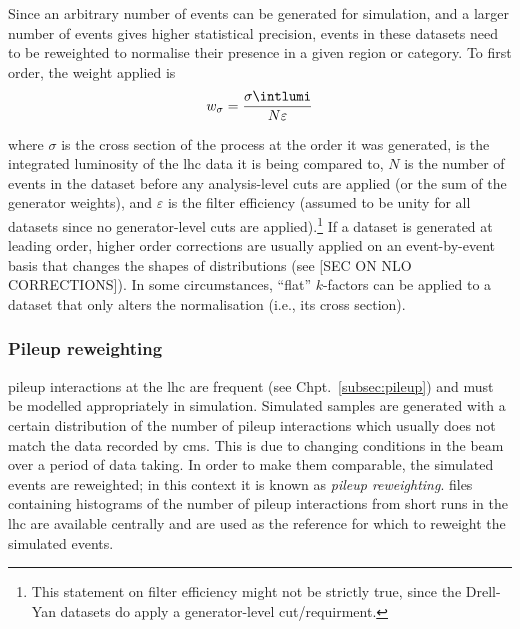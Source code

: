 Since an arbitrary number of events can be generated for simulation, and a larger number of events gives higher statistical precision, events in these datasets need to be reweighted to normalise their presence in a given region or category. To first order, the weight applied is
\begin{equation}
    w_{\sigma} = \frac{ \sigma \intlumi }{ N \varepsilon }
    \label{eq:xs_weight}
\end{equation}

where $\sigma$ is the cross section of the process at the order it was generated, \intlumi is the integrated luminosity of the \acrshort{lhc} data it is being compared to, $N$ is the number of events in the dataset before any analysis-level cuts are applied (or the sum of the generator weights), and $\varepsilon$ is the filter efficiency (assumed to be unity for all datasets since no generator-level cuts are applied).\footnote{This statement on filter efficiency might not be strictly true, since the Drell-Yan datasets do apply a generator-level cut/requirment.} If a dataset is generated at leading order, higher order corrections are usually applied on an event-by-event basis that changes the shapes of distributions (see [SEC ON NLO CORRECTIONS]). In some circumstances, ``flat'' $k$-factors can be applied to a dataset that only alters the normalisation (i.e., its cross section).




\subsubsection{Pileup reweighting}
\label{subsubsec:pu_reweighting}

\Gls{pileup} interactions at the \acrshort{lhc} are frequent (see Chpt.~\ref{subsec:pileup}) and must be modelled appropriately in simulation. Simulated samples are generated with a certain distribution of the number of \gls{pileup} interactions which usually does not match the data recorded by \acrshort{cms}. This is due to changing conditions in the beam over a period of data taking. In order to make them comparable, the simulated events are reweighted; in this context it is known as \emph{\gls{pileup} reweighting}. \ROOT files containing histograms of the number of \gls{pileup} interactions from short runs in the \acrshort{lhc} are available centrally and are used as the reference for which to reweight the simulated events.

